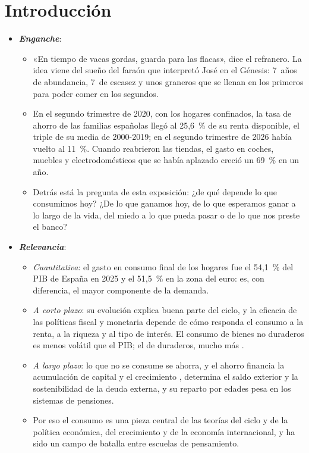 \documentclass[11pt]{article}
\begin{document}
\tceetitulo

\section*{Introducción}

\begin{itemize}
\item \textbf{\emph{Enganche}}:
  \begin{itemize}
  \item «En tiempo de vacas gordas, guarda para las flacas», dice el refranero. La idea viene del sueño del faraón que interpretó José en el Génesis: 7~años de abundancia, 7~de escasez y unos graneros que se llenan en los primeros para poder comer en los segundos.
  \item En el segundo trimestre de 2020, con los hogares confinados, la tasa de ahorro de las familias españolas llegó al 25,6~\% de su renta disponible, el triple de su media de 2000-2019; en el segundo trimestre de 2026 había vuelto al 11~\%\nocite{INE2026CTNFSI}. Cuando reabrieron las tiendas, el gasto en coches, muebles y electrodomésticos que se había aplazado creció un 69~\% en un año\nocite{INE2026CNTRDemanda}.
  \item Detrás está la pregunta de esta exposición: ¿de qué depende lo que consumimos hoy? ¿De lo que ganamos hoy, de lo que esperamos ganar a lo largo de la vida, del miedo a lo que pueda pasar o de lo que nos preste el banco?
  \end{itemize}

\item \textbf{\emph{Relevancia}}:
  \begin{itemize}
  \item \emph{Cuantitativa}: el gasto en consumo final de los hogares fue el 54,1~\% del PIB de España en 2025\nocite{INE2026CNA2025} y el 51,5~\% en la zona del euro\nocite{Eurostat2026Nama10gdp}: es, con diferencia, el mayor componente de la demanda.
  \item \emph{A corto plazo}: su evolución explica buena parte del ciclo, y la eficacia de las políticas fiscal y monetaria depende de cómo responda el consumo a la renta, a la riqueza y al tipo de interés. El consumo de bienes no duraderos es menos volátil que el PIB; el de duraderos, mucho más .
  \item \emph{A largo plazo}: lo que no se consume se ahorra, y el ahorro financia la acumulación de capital y el crecimiento , determina el saldo exterior y la sostenibilidad de la deuda externa, y su reparto por edades pesa en los sistemas de pensiones.
  \item Por eso el consumo es una pieza central de las teorías del ciclo y de la política económica, del crecimiento y de la economía internacional, y ha sido un campo de batalla entre escuelas de pensamiento.
  \end{itemize}


\end{itemize}
\end{document}
